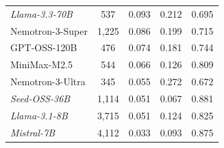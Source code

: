 \begin{tabular}{@{}l c c c c@{}}
\textit{Llama-3.3-70B} & 537 & \cellcolor[HTML]{E8B385} 0.093 & \cellcolor[HTML]{E8B285} 0.212 & \cellcolor[HTML]{DED386} 0.695 \\
Nemotron-3-Super & 1{,}225 & \cellcolor[HTML]{E7AD86} 0.086 & \cellcolor[HTML]{EABC84} 0.199 & \cellcolor[HTML]{EAD583} 0.715 \\
GPT-OSS-120B & 476 & \cellcolor[HTML]{E5A487} 0.074 & \cellcolor[HTML]{EDCA83} 0.181 & \cellcolor[HTML]{EECC83} 0.744 \\
MiniMax-M2.5 & 544 & \cellcolor[HTML]{E49E87} 0.066 & \cellcolor[HTML]{CAD18A} 0.126 & \cellcolor[HTML]{E6AA86} 0.809 \\
Nemotron-3-Ultra & 345 & \cellcolor[HTML]{E29588} 0.055 & \cellcolor[HTML]{DE848A} 0.272 & \cellcolor[HTML]{CFD189} 0.672 \\
\textit{Seed-OSS-36B} & 1{,}114 & \cellcolor[HTML]{E19289} 0.051 & \cellcolor[HTML]{93C995} 0.067 & \cellcolor[HTML]{DE848A} 0.881 \\
\textit{Llama-3.1-8B} & 3{,}715 & \cellcolor[HTML]{E19289} 0.051 & \cellcolor[HTML]{C8D08A} 0.124 & \cellcolor[HTML]{E4A187} 0.825 \\
\textit{Mistral-7B} & 4{,}112 & \cellcolor[HTML]{DE848A} 0.033 & \cellcolor[HTML]{ABCC90} 0.093 & \cellcolor[HTML]{DF878A} 0.875 \\
\bottomrule
\end{tabular}
